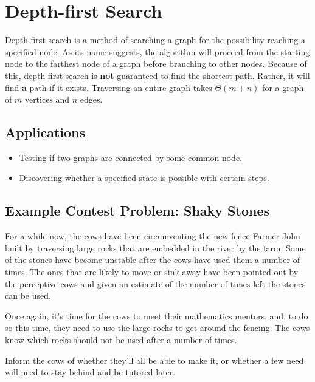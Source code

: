 \section{Depth-first Search}

Depth-first search is a method of searching a graph for the possibility reaching a specified node.
As its name suggests, the algorithm will proceed from the starting node to the farthest node of a graph before branching to other nodes.
Because of this, depth-first search is \textbf{not} guaranteed to find the shortest path.
Rather, it will find \textbf{a} path if it exists.
Traversing an entire graph takes $\Theta (m + n)$ for a graph of $m$ vertices and $n$ edges.

\subsection{Applications}
\begin{itemize}
	\item Testing if two graphs are connected by some common node.
	\item Discovering whether a specified state is possible with certain steps.
\end{itemize}

\subsection{Example Contest Problem: Shaky Stones}
For a while now, the cows have been circumventing the new fence Farmer John built by traversing large rocks that are embedded in the river by the farm.
Some of the stones have become unstable after the cows have used them a number of times.
The ones that are likely to move or sink away have been pointed out by the perceptive cows and given an estimate of the number of times left the stones can be used.

Once again, it's time for the cows to meet their mathematics mentors, and, to do so this time, they need to use the large rocks to get around the fencing.
The cows know which rocks should not be used after a number of times.

Inform the cows of whether they'll all be able to make it, or whether a few need will need to stay behind and be tutored later.

